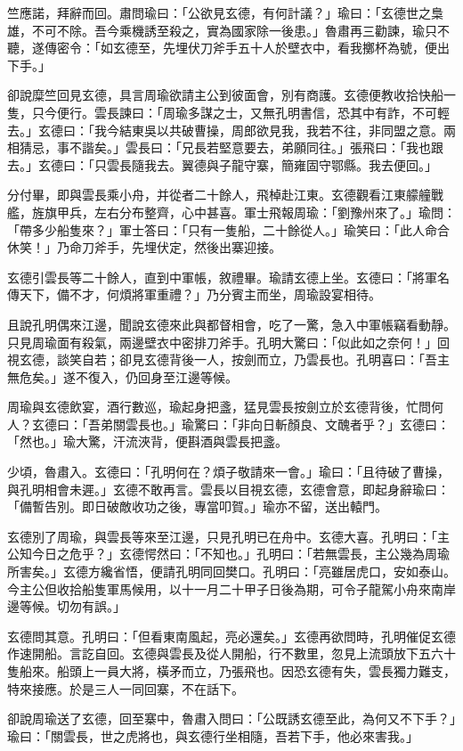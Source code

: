 竺應諾，拜辭而回。肅問瑜曰：「公欲見玄德，有何計議？」瑜曰：「玄德世之梟雄，不可不除。吾今乘機誘至殺之，實為國家除一後患。」魯肅再三勸諫，瑜只不聽，遂傳密令：「如玄德至，先埋伏刀斧手五十人於壁衣中，看我擲杯為號，便出下手。」

卻說糜竺回見玄德，具言周瑜欲請主公到彼面會，別有商護。玄德便教收拾快船一隻，只今便行。雲長諫曰：「周瑜多謀之士，又無孔明書信，恐其中有詐，不可輕去。」玄德曰：「我今結東吳以共破曹操，周郎欲見我，我若不往，非同盟之意。兩相猜忌，事不諧矣。」雲長曰：「兄長若堅意要去，弟願同往。」張飛曰：「我也跟去。」玄德曰：「只雲長隨我去。翼德與子龍守寨，簡雍固守鄂縣。我去便回。」

分付畢，即與雲長乘小舟，并從者二十餘人，飛棹赴江東。玄德觀看江東艨艟戰艦，旌旗甲兵，左右分布整齊，心中甚喜。軍士飛報周瑜：「劉豫州來了。」瑜問：「帶多少船隻來？」軍士答曰：「只有一隻船，二十餘從人。」瑜笑曰：「此人命合休笑！」乃命刀斧手，先埋伏定，然後出寨迎接。

玄德引雲長等二十餘人，直到中軍帳，敘禮畢。瑜請玄德上坐。玄德曰：「將軍名傳天下，備不才，何煩將軍重禮？」乃分賓主而坐，周瑜設宴相待。

且說孔明偶來江邊，聞說玄德來此與都督相會，吃了一驚，急入中軍帳竊看動靜。只見周瑜面有殺氣，兩邊壁衣中密排刀斧手。孔明大驚曰：「似此如之奈何！」回視玄德，談笑自若；卻見玄德背後一人，按劍而立，乃雲長也。孔明喜曰：「吾主無危矣。」遂不復入，仍回身至江邊等候。

周瑜與玄德飲宴，酒行數巡，瑜起身把盞，猛見雲長按劍立於玄德背後，忙問何人？玄德曰：「吾弟關雲長也。」瑜驚曰：「非向日斬顏良、文醜者乎？」玄德曰：「然也。」瑜大驚，汗流浹背，便斟酒與雲長把盞。

少頃，魯肅入。玄德曰：「孔明何在？煩子敬請來一會。」瑜曰：「且待破了曹操，與孔明相會未遲。」玄德不敢再言。雲長以目視玄德，玄德會意，即起身辭瑜曰：「備暫告別。即日破敵收功之後，專當叩賀。」瑜亦不留，送出轅門。

玄德別了周瑜，與雲長等來至江邊，只見孔明已在舟中。玄德大喜。孔明曰：「主公知今日之危乎？」玄德愕然曰：「不知也。」孔明曰：「若無雲長，主公幾為周瑜所害矣。」玄德方纔省悟，便請孔明同回樊口。孔明曰：「亮雖居虎口，安如泰山。今主公但收拾船隻軍馬候用，以十一月二十甲子日後為期，可令子龍駕小舟來南岸邊等候。切勿有誤。」

玄德問其意。孔明曰：「但看東南風起，亮必還矣。」玄德再欲問時，孔明催促玄德作速開船。言訖自回。玄德與雲長及從人開船，行不數里，忽見上流頭放下五六十隻船來。船頭上一員大將，橫矛而立，乃張飛也。因恐玄德有失，雲長獨力難支，特來接應。於是三人一同回寨，不在話下。

卻說周瑜送了玄德，回至寨中，魯肅入問曰：「公既誘玄德至此，為何又不下手？」瑜曰：「關雲長，世之虎將也，與玄德行坐相隨，吾若下手，他必來害我。」

